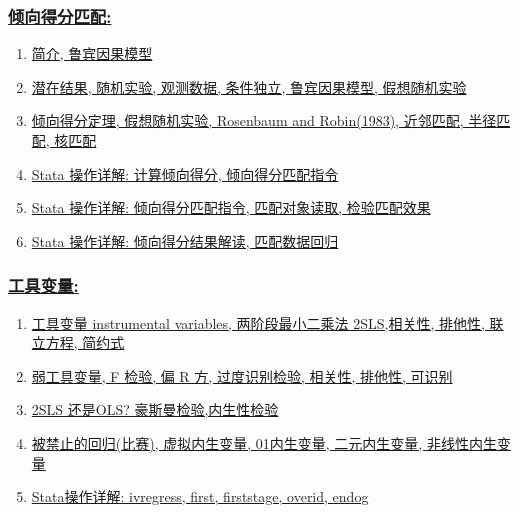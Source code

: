 \documentclass[11pt]{article}
\begin{document}
\subsubsection*{\href{https://space.bilibili.com/421438815/lists/813891?type=season}{\kaishu 倾向得分匹配:}}

\vspace{-0.25cm}

\begin{enumerate}
	\item \href{URLhttps://mp.weixin.qq.com/s/nqHhY8w6u1Od2Mfl6e97Fg}{简介, 鲁宾因果模型}
	\item \href{https://mp.weixin.qq.com/s/Uu3KEcNG3ECdbC8bL_NtKA}{潜在结果, 随机实验, 观测数据, 条件独立, 鲁宾因果模型, 假想随机实验}
	\item \href{https://mp.weixin.qq.com/s/gLDTBrMqyW93nOzYDJy6IQ}{倾向得分定理, 假想随机实验, Rosenbaum and Robin(1983), 近邻匹配, 半径匹配, 核匹配}
	\item \href{https://mp.weixin.qq.com/s/v0Kq34XXf0jGO0gtS-BTng}{Stata 操作详解: 计算倾向得分, 倾向得分匹配指令}
	\item \href{https://mp.weixin.qq.com/s/uUXJzggQCx--5i5vs_-_hw}{Stata 操作详解: 倾向得分匹配指令, 匹配对象读取, 检验匹配效果}
	\item \href{https://mp.weixin.qq.com/s/NvAopch22BI4-IJc07E0eg}{Stata 操作详解: 倾向得分结果解读, 匹配数据回归}
\end{enumerate}


\subsubsection*{\href{https://space.bilibili.com/421438815/lists/1043569?type=season}{\kaishu 工具变量:}}

\vspace{-0.25cm}

\begin{enumerate}
	\item \href{https://mp.weixin.qq.com/s/ZT9hly47Fa3-Ag8YiwjS1A}{工具变量 instrumental variables, 两阶段最小二乘法 2SLS,相关性, 排他性, 联立方程, 简约式}
	\item \href{https://mp.weixin.qq.com/s/iMTV2k1a_cnAFDHwz8b04Q}{弱工具变量, F 检验, 偏 R 方, 过度识别检验, 相关性, 排他性, 可识别}
	\item \href{https://mp.weixin.qq.com/s/c0IGE8_P0R_E0BrJd9_GRw}{2SLS 还是OLS? 豪斯曼检验,内生性检验}
	\item \href{https://mp.weixin.qq.com/s/ymBux95BhKxKsXMrj7dGpg}{被禁止的回归(比赛), 虚拟内生变量, 01内生变量, 二元内生变量, 非线性内生变量}
	\item \href{https://mp.weixin.qq.com/s/-Qtk2aBJajDju1zYjHyRcg}{Stata操作详解: ivregress, first, firststage, overid, endog}
\end{enumerate}
\end{document}
